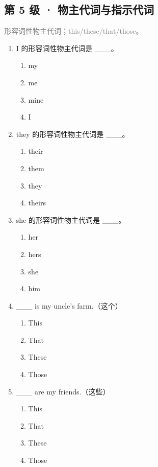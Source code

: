 \documentclass[11pt,a4paper]{ctexart}
\begin{document}
\subsection*{第 5 级 · 物主代词与指示代词}
\noindent\textcolor{gray}{形容词性物主代词；this/these/that/those。}\par\smallskip
\begin{enumerate}[leftmargin=*,itemsep=4pt]
\item I 的形容词性物主代词是 \_\_\_。
\begin{enumerate}[label=\Alph*.,leftmargin=2em,itemsep=1pt,topsep=2pt]
\item my
\item me
\item mine
\item I
\end{enumerate}
\item they 的形容词性物主代词是 \_\_\_。
\begin{enumerate}[label=\Alph*.,leftmargin=2em,itemsep=1pt,topsep=2pt]
\item their
\item them
\item they
\item theirs
\end{enumerate}
\item she 的形容词性物主代词是 \_\_\_。
\begin{enumerate}[label=\Alph*.,leftmargin=2em,itemsep=1pt,topsep=2pt]
\item her
\item hers
\item she
\item him
\end{enumerate}
\item \_\_\_ is my uncle’s farm.（这个）
\begin{enumerate}[label=\Alph*.,leftmargin=2em,itemsep=1pt,topsep=2pt]
\item This
\item That
\item These
\item Those
\end{enumerate}
\item \_\_\_ are my friends.（这些）
\begin{enumerate}[label=\Alph*.,leftmargin=2em,itemsep=1pt,topsep=2pt]
\item This
\item That
\item These
\item Those

\end{enumerate}
\end{enumerate}
\end{document}
